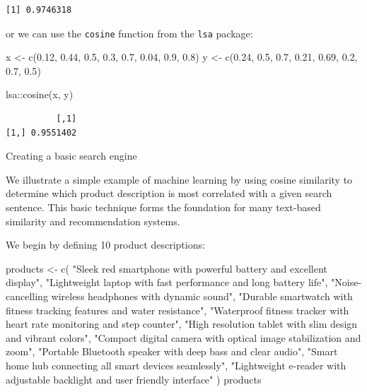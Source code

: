 \documentclass[
  letterpaper,
  DIV=11,
  numbers=noendperiod]{scrartcl}
\newenvironment{Shaded}{\begin{snugshade}}{\end{snugshade}}
\newcommand{\FloatTok}[1]{\textcolor[rgb]{0.68,0.00,0.00}{#1}}
\newcommand{\FunctionTok}[1]{\textcolor[rgb]{0.28,0.35,0.67}{#1}}
\newcommand{\NormalTok}[1]{\textcolor[rgb]{0.00,0.23,0.31}{#1}}
\newcommand{\OtherTok}[1]{\textcolor[rgb]{0.00,0.23,0.31}{#1}}
\newcommand{\SpecialCharTok}[1]{\textcolor[rgb]{0.37,0.37,0.37}{#1}}
\newcommand{\StringTok}[1]{\textcolor[rgb]{0.13,0.47,0.30}{#1}}
\begin{document}
\begin{verbatim}
[1] 0.9746318
\end{verbatim}

or we can use the \texttt{cosine} function from the \texttt{lsa}
package:

\begin{Shaded}
\begin{Highlighting}[]
\NormalTok{x }\OtherTok{\textless{}{-}} \FunctionTok{c}\NormalTok{(}\FloatTok{0.12}\NormalTok{, }\FloatTok{0.44}\NormalTok{, }\FloatTok{0.5}\NormalTok{, }\FloatTok{0.3}\NormalTok{, }\FloatTok{0.7}\NormalTok{, }\FloatTok{0.04}\NormalTok{, }\FloatTok{0.9}\NormalTok{, }\FloatTok{0.8}\NormalTok{)}
\NormalTok{y }\OtherTok{\textless{}{-}} \FunctionTok{c}\NormalTok{(}\FloatTok{0.24}\NormalTok{, }\FloatTok{0.5}\NormalTok{, }\FloatTok{0.7}\NormalTok{, }\FloatTok{0.21}\NormalTok{, }\FloatTok{0.69}\NormalTok{, }\FloatTok{0.2}\NormalTok{, }\FloatTok{0.7}\NormalTok{, }\FloatTok{0.5}\NormalTok{)}

\NormalTok{lsa}\SpecialCharTok{::}\FunctionTok{cosine}\NormalTok{(x, y)}
\end{Highlighting}
\end{Shaded}

\begin{verbatim}
          [,1]
[1,] 0.9551402
\end{verbatim}

Creating a basic search engine

We illustrate a simple example of machine learning by using cosine
similarity to determine which product description is most correlated
with a given search sentence. This basic technique forms the foundation
for many text-based similarity and recommendation systems.

We begin by defining 10 product descriptions:

\begin{Shaded}
\begin{Highlighting}[]
\NormalTok{products }\OtherTok{\textless{}{-}} \FunctionTok{c}\NormalTok{(}
  \StringTok{"Sleek red smartphone with powerful battery and excellent display"}\NormalTok{,}
  \StringTok{"Lightweight laptop with fast performance and long battery life"}\NormalTok{,}
  \StringTok{"Noise{-}cancelling wireless headphones with dynamic sound"}\NormalTok{,}
  \StringTok{"Durable smartwatch with fitness tracking features and water resistance"}\NormalTok{,}
  \StringTok{"Waterproof fitness tracker with heart rate monitoring and step counter"}\NormalTok{,}
  \StringTok{"High resolution tablet with slim design and vibrant colors"}\NormalTok{,}
  \StringTok{"Compact digital camera with optical image stabilization and zoom"}\NormalTok{,}
  \StringTok{"Portable Bluetooth speaker with deep bass and clear audio"}\NormalTok{,}
  \StringTok{"Smart home hub connecting all smart devices seamlessly"}\NormalTok{,}
  \StringTok{"Lightweight e{-}reader with adjustable backlight and user friendly interface"}
\NormalTok{)}
\NormalTok{products}
\end{Highlighting}
\end{Shaded}
\end{document}
